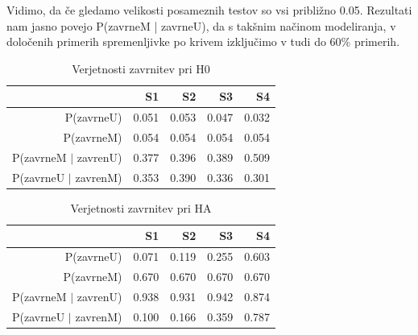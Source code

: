 \documentclass[letterpaper,11pt]{article}
\begin{document}
Vidimo, da če gledamo velikosti posameznih testov so vsi približno 0.05. Rezultati nam jasno povejo P(zavrneM | zavrneU), da s takšnim načinom modeliranja, v določenih primerih spremenljivke po krivem izključimo v tudi do 60\% primerih.
\begin{table}[ht]
\centering
\begin{tabular}{rrrrr}
  \hline
 & S1 & S2 & S3 & S4 \\ 
  \hline
P(zavrneU) & 0.051 & 0.053 & 0.047 & 0.032 \\ 
  P(zavrneM) & 0.054 & 0.054 & 0.054 & 0.054 \\ 
  P(zavrneM $|$ zavrenU) & 0.377 & 0.396 & 0.389 & 0.509 \\ 
  P(zavrneU $|$ zavrenM) & 0.353 & 0.390 & 0.336 & 0.301 \\ 
   \hline
\end{tabular}
\caption{Verjetnosti zavrnitev pri H0} 
\label{table:4}
\end{table}

\begin{table}[ht]
\centering
\begin{tabular}{rrrrr}
  \hline
 & S1 & S2 & S3 & S4 \\ 
  \hline
P(zavrneU) & 0.071 & 0.119 & 0.255 & 0.603 \\ 
  P(zavrneM) & 0.670 & 0.670 & 0.670 & 0.670 \\ 
  P(zavrneM $|$ zavrenU) & 0.938 & 0.931 & 0.942 & 0.874 \\ 
  P(zavrneU $|$ zavrenM) & 0.100 & 0.166 & 0.359 & 0.787 \\ 
   \hline
\end{tabular}
\caption{Verjetnosti zavrnitev pri HA} 
\label{table:5}
\end{table}
\end{document}
